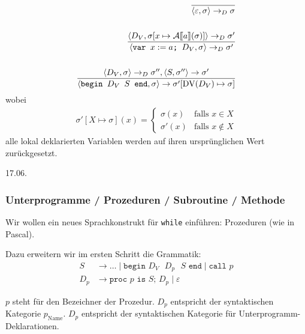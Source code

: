 \begin{align*}
    \frac{}{\langle \varepsilon, \sigma \rangle \to_D \sigma} \\
    \\
    \frac{
        \langle D_V, \sigma[x \mapsto \mathcal{A}\mathrm{[}\kern-.14em\mathrm{[} a\mathrm{]}\kern-.14em\mathrm{]}(\sigma)] \rangle \to_D \sigma'
    }{
        \langle \texttt{var } x := a \texttt{; } D_V, \sigma \rangle \to_D \sigma'
    } \\
    \\
    \frac{
        \langle D_V, \sigma \rangle \to_D \sigma'', \langle S, \sigma'' \rangle \to \sigma'
    }{
        \langle \texttt{begin $D_V$ $S$ end}, \sigma \rangle \to \sigma'[\operatorname{DV}(D_V) \mapsto \sigma]
    }
\end{align*}
wobei
\begin{align*}
    \sigma'[X \mapsto \sigma](x) = \begin{cases}
        \sigma(x) & \text{falls } x \in X \\
        \sigma'(x) & \text{falls } x \not\in X
    \end{cases}
\end{align*}
\dh{} alle lokal deklarierten Variablen werden auf ihren ursprünglichen Wert zurückgesetzt.


\newpage
\hfill 17.06.

\subsubsection{Unterprogramme / Prozeduren / Subroutine / Methode}

Wir wollen ein neues Sprachkonstrukt für \texttt{while} einführen: Prozeduren (wie in Pascal).

Dazu erweitern wir im ersten Schritt die Grammatik:
\begin{align*}
    S & \to \dots \;\vert\; \texttt{begin $D_V$ $D_p$ $S$ end} \;\vert\; \texttt{call $p$} \\
    D_p & \to \texttt{proc $p$ is $S$; $D_p$} \;\vert\; \varepsilon
\end{align*}

$p$ steht für den Bezeichner der Prozedur. $D_p$ entspricht der syntaktischen Kategorie $p_{\text{Name}}$.
$D_p$ entspricht der syntaktischen Kategorie für Unterprogramm-Deklarationen.

